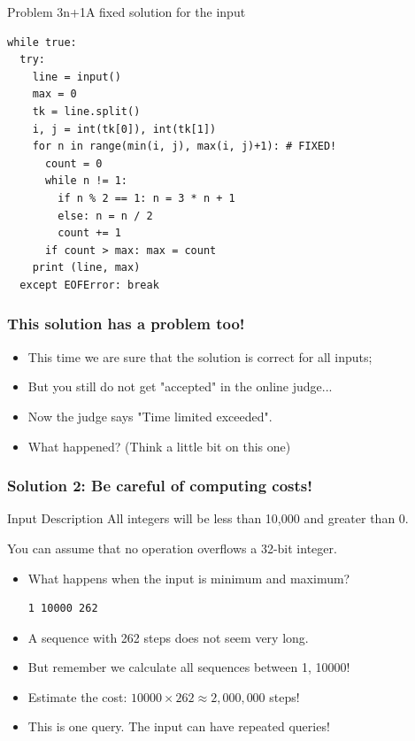 \begin{frame}[fragile]{Problem 3n+1}{A fixed solution for the input}
  {\smaller
\begin{verbatim}
while true:
  try:
    line = input()
    max = 0
    tk = line.split()
    i, j = int(tk[0]), int(tk[1])
    for n in range(min(i, j), max(i, j)+1): # FIXED!
      count = 0
      while n != 1:
        if n % 2 == 1: n = 3 * n + 1
        else: n = n / 2
        count += 1
      if count > max: max = count
    print (line, max)
  except EOFError: break
\end{verbatim}}
\end{frame}

\begin{frame}
  \frametitle{This solution has a problem too!}
  \begin{itemize}
    \item This time we are sure that the solution is correct for all inputs;
    \item But you still do not get "accepted" in the online judge...
    \bigskip

    \item Now the judge says \alert{"Time limited exceeded"}.
    \bigskip

    \item What happened? (Think a little bit on this one)
  \end{itemize}
\end{frame}

\begin{frame}[fragile]
  \frametitle{Solution 2: Be careful of computing costs!}

    \begin{block}{Input Description}
    All integers will be \alert{less than 10,000 and greater than 0.}
    \bigskip

    You can \alert{assume that no operation overflows a 32-bit integer}.
    \end{block}
    \bigskip

    \begin{itemize}
      \item What happens when the input is \alert{minimum and maximum}?
\begin{verbatim}
1 10000 262
\end{verbatim}
      \bigskip

      \item A sequence with 262 steps does not seem very long.
      \item But remember we calculate \alert{all} sequences between 1, 10000!
      \item Estimate the cost: $10000 \times 262 \approx 2,000,000$ steps!
      \bigskip

      \item This is one query. The input can have repeated queries!
    \end{itemize}
\end{frame}

